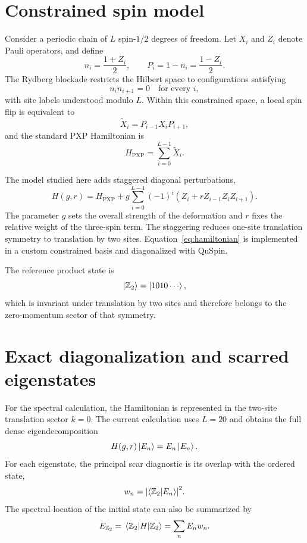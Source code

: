 \documentclass[11pt]{article}
\newcommand{\Hpxp}{H_{\mathrm{PXP}}}
\newcommand{\Ztwo}{\mathbb{Z}_2}
\newcommand{\Xtilde}{\widetilde{X}}
\begin{document}
\section{Constrained spin model}

Consider a periodic chain of $L$ spin-$1/2$ degrees of freedom. Let $X_i$ and
$Z_i$ denote Pauli operators, and define
\begin{equation}
  n_i=\frac{1+Z_i}{2},
  \qquad
  P_i=1-n_i=\frac{1-Z_i}{2}.
\end{equation}
The Rydberg blockade restricts the Hilbert space to configurations satisfying
\begin{equation}
  n_i n_{i+1}=0
  \quad \text{for every }i,
\end{equation}
with site labels understood modulo $L$. Within this constrained space, a local spin
flip is equivalent to
\begin{equation}
  \Xtilde_i=P_{i-1}X_iP_{i+1},
\end{equation}
and the standard PXP Hamiltonian is
\begin{equation}
  \Hpxp=\sum_{i=0}^{L-1}\Xtilde_i.
\end{equation}

The model studied here adds staggered diagonal perturbations,
\begin{equation}
  H(g,r)=\Hpxp
  +g\sum_{i=0}^{L-1}(-1)^i
  \left(Z_i+r Z_{i-1}Z_iZ_{i+1}\right).
  \label{eq:hamiltonian}
\end{equation}
The parameter $g$ sets the overall strength of the deformation and $r$ fixes the
relative weight of the three-spin term. The staggering reduces one-site translation
symmetry to translation by two sites. Equation~\eqref{eq:hamiltonian} is implemented
in a custom constrained basis and diagonalized with QuSpin.

The reference product state is
\begin{equation}
  \ket{\Ztwo}=\ket{1010\cdots},
\end{equation}
which is invariant under translation by two sites and therefore belongs to the
zero-momentum sector of that symmetry.

\section{Exact diagonalization and scarred eigenstates}

For the spectral calculation, the Hamiltonian is represented in the two-site
translation sector $k=0$. The current calculation uses $L=20$ and obtains the full
dense eigendecomposition
\begin{equation}
  H(g,r)\ket{E_n}=E_n\ket{E_n}.
\end{equation}
For each eigenstate, the principal scar diagnostic is its overlap with the ordered
state,
\begin{equation}
  w_n=\abs{\braket{\Ztwo}{E_n}}^2.
  \label{eq:overlap}
\end{equation}
The spectral location of the initial state can also be summarized by
\begin{equation}
  E_{\Ztwo}=\mel{\Ztwo}{H}{\Ztwo}
  =\sum_n E_n w_n.
\end{equation}
\end{document}
